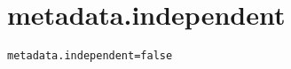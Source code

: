 \section{metadata.independent}
\label{configuration:MetadataIndependent}
\AvailableInJavaAndCsharp{\TODO}
\begin{lstlisting}[style=Props,caption={Usage example for \textit{metadata.independent}}]
metadata.independent=false
\end{lstlisting}